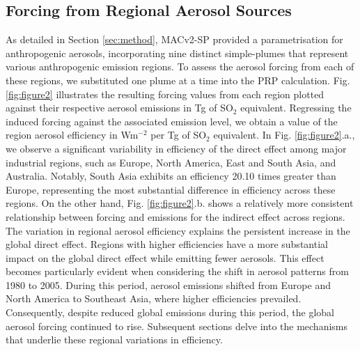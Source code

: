 \documentclass[draft]{agujournal2019}
\begin{document}
      \subsection{Forcing from Regional Aerosol Sources}
            As detailed in Section \ref{sec:method}, MACv2-SP provided a parametrisation for anthropogenic aerosols, incorporating nine distinct simple-plumes that represent various anthropogenic emission regions. To assess the aerosol forcing from each of these regions, we substituted one plume at a time into the PRP calculation. Fig. \ref{fig:figure2} illustrates the resulting forcing values from each region plotted against their respective aerosol emissions in Tg of SO$_2$ equivalent. Regressing the induced forcing against the associated emission level, we obtain a value of the region aerosol efficiency in Wm$^{-2}$ per Tg of SO$_2$ equivalent.
            In Fig. \ref{fig:figure2}.a., we observe a significant variability in efficiency of the direct effect among major industrial regions, such as Europe, North America, East and South Asia, and Australia. Notably, South Asia exhibits an efficiency 20.10 times greater than Europe, representing the most substantial difference in efficiency across these regions. On the other hand, Fig. \ref{fig:figure2}.b. shows a relatively more consistent relationship between forcing and emissions for the indirect effect across regions. 
            The variation in regional aerosol efficiency explains the persistent increase in the global direct effect. Regions with higher efficiencies have a more substantial impact on the global direct effect while emitting fewer aerosols. This effect becomes particularly evident when considering the shift in aerosol patterns from 1980 to 2005. During this period, aerosol emissions shifted from Europe and North America to Southeast Asia, where higher efficiencies prevailed. Consequently, despite reduced global emissions during this period, the global aerosol forcing continued to rise.
            Subsequent sections delve into the mechanisms that underlie these regional variations in efficiency.
\end{document}
